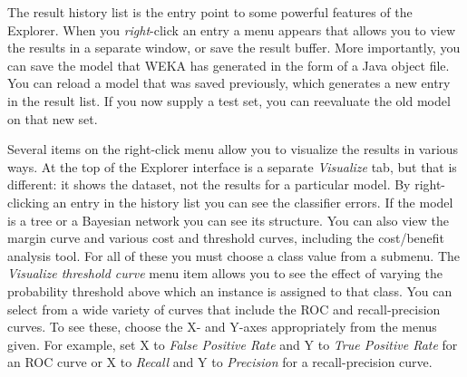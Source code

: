 The result history list is the entry point to some powerful features
of the Explorer. When you \textit{right}-click an entry a menu appears that
allows you to view the results in a separate window, or save the
result buffer. More importantly, you can save the model that WEKA has
generated in the form of a Java object file. You can reload a model
that was saved previously, which generates a new entry in the result
list. If you now supply a test set, you can reevaluate the old model
on that new set.

Several items on the right-click menu allow you to visualize the
results in various ways. At the top of the Explorer interface is a
separate \textit{Visualize} tab, but that is different: it shows the
dataset, not the results for a particular model. By right-clicking an
entry in the history list you can see the classifier errors. If the
model is a tree or a Bayesian network you can see its structure. You
can also view the margin curve and various cost and threshold curves,
including the cost/benefit analysis tool. For all of these you must
choose a class value from a submenu. The \textit{Visualize threshold
  curve} menu item allows you to see the effect of varying the
probability threshold above which an instance is assigned to that
class. You can select from a wide variety of curves that include the
ROC and recall-precision curves. To see these, choose the X- and
Y-axes appropriately from the menus given. For example, set X to
\textit{False Positive Rate} and Y to \textit{True Positive Rate} for
an ROC curve or X to \textit{Recall} and Y to \textit{Precision} for a
recall-precision curve.


